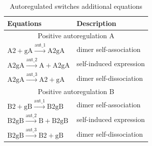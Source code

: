 \begin{table}[htbp]
\centering
\caption{Autoregulated switches additional equations}
\label{tab:autoreg_equs}
\begin{tabular}{@{}ll@{}}
\toprule
Equations                                                                              & Description             \\ \midrule
\multicolumn{2}{c}{ Positive autoregulation A}                                                                 \\\midrule
$\textrm{A2} + \textrm{gA} \stackrel{\textrm{aut\_1}}{\longrightarrow} \textrm{A2gA}$  & dimer self-association  \\
$\textrm{A2gA} \stackrel{\textrm{aut\_2}}{\longrightarrow} \textrm{A} + \textrm{A2gA}$ & self-induced expression \\
$\textrm{A2gA} \stackrel{\textrm{aut\_3}}{\longrightarrow} \textrm{A2}+ \textrm{gA}$   & dimer self-dissociation \\\midrule
\multicolumn{2}{c}{Positive autoregulation B}                                                                    \\\midrule
$\textrm{B2} + \textrm{gB} \stackrel{\textrm{aut\_1}}{\longrightarrow} \textrm{B2gB}$  & dimer self-association  \\
$\textrm{B2gB} \stackrel{\textrm{aut\_2}}{\longrightarrow} \textrm{B} + \textrm{B2gB}$ & self-induced expression \\
$\textrm{B2gB} \stackrel{\textrm{aut\_3}}{\longrightarrow} \textrm{B2}+ \textrm{gB}$   & dimer self-dissociation \\ \bottomrule
\end{tabular}
\end{table}
%
%
%

